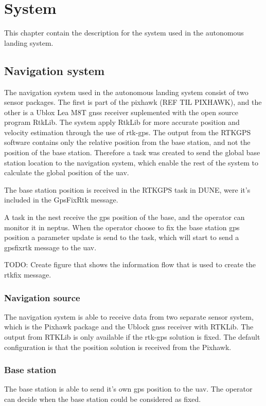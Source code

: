 \chapter{System}
This chapter contain the description for the system used in the autonomous landing system.
\section{Navigation system}
The navigation system used in the autonomous landing system consist of two sensor packages. The first is part of the pixhawk (REF TIL PIXHAWK), and the other is a Ublox Lea M8T \gls{gnss} receiver suplemented with the open source program RtkLib. The system apply RtkLib for more accurate position and velocity estimation through the use of \gls{rtk-gps}. The output from the RTKGPS software contains only the relative position from the base station, and not the position of the base station. Therefore a task was created to send the global base station location to the navigation system, which enable the rest of the system to calculate the global position of the uav.

The base station position is received in the RTKGPS task in DUNE, were it's included in the GpsFixRtk message.

A task in the nest receive the gps position of the base, and the operator can monitor it in neptus. When the operator choose to fix the base station gps position a parameter update is send to the task, which will start to send a gpsfixrtk message to the uav. 

TODO: Create figure that shows the information flow that is used to create the rtkfix message.
\subsection{Navigation source}
The navigation system is able to receive data from two separate sensor system, which is the Pixhawk package and the Ublock \gls{gnss} receiver with RTKLib. The output from RTKLib is only available if the \gls{rtk-gps} solution is fixed. The default configuration is that the position solution is received from the Pixhawk.

\subsection{Base station}
The base station is able to send it's own gps position to the \gls{uav}. The operator can decide when the base station could be considered as fixed.
